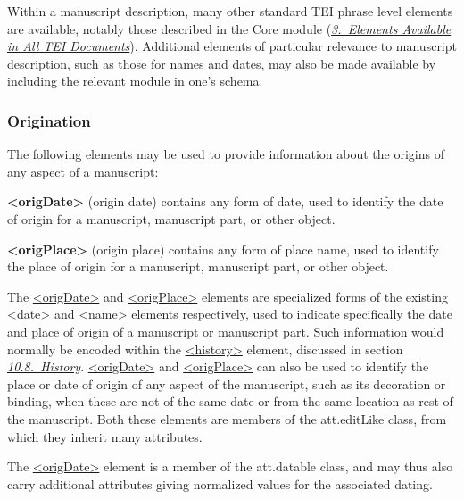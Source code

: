 \par
Within a manuscript description, many other standard TEI phrase level elements are available, notably those described in the Core module (\textit{\hyperref[CO]{3.\ Elements Available in All TEI Documents}}). Additional elements of particular relevance to manuscript description, such as those for names and dates, may also be made available by including the relevant module in one's schema.
\subsubsection[{Origination}]{Origination}\label{msdates}\par
The following elements may be used to provide information about the origins of any aspect of a manuscript: 
\begin{sansreflist}
  
\item [\textbf{<origDate>}] (origin date) contains any form of date, used to identify the date of origin for a manuscript, manuscript part, or other object.
\item [\textbf{<origPlace>}] (origin place) contains any form of place name, used to identify the place of origin for a manuscript, manuscript part, or other object.
\end{sansreflist}
\par
The \hyperref[TEI.origDate]{<origDate>} and \hyperref[TEI.origPlace]{<origPlace>} elements are specialized forms of the existing \hyperref[TEI.date]{<date>} and \hyperref[TEI.name]{<name>} elements respectively, used to indicate specifically the date and place of origin of a manuscript or manuscript part. Such information would normally be encoded within the \hyperref[TEI.history]{<history>} element, discussed in section \textit{\hyperref[mshy]{10.8.\ History}}. \hyperref[TEI.origDate]{<origDate>} and \hyperref[TEI.origPlace]{<origPlace>} can also be used to identify the place or date of origin of any aspect of the manuscript, such as its decoration or binding, when these are not of the same date or from the same location as rest of the manuscript. Both these elements are members of the \textsf{att.editLike} class, from which they inherit many attributes. \par
The \hyperref[TEI.origDate]{<origDate>} element is a member of the \textsf{att.datable} class, and may thus also carry additional attributes giving normalized values for the associated dating. 
